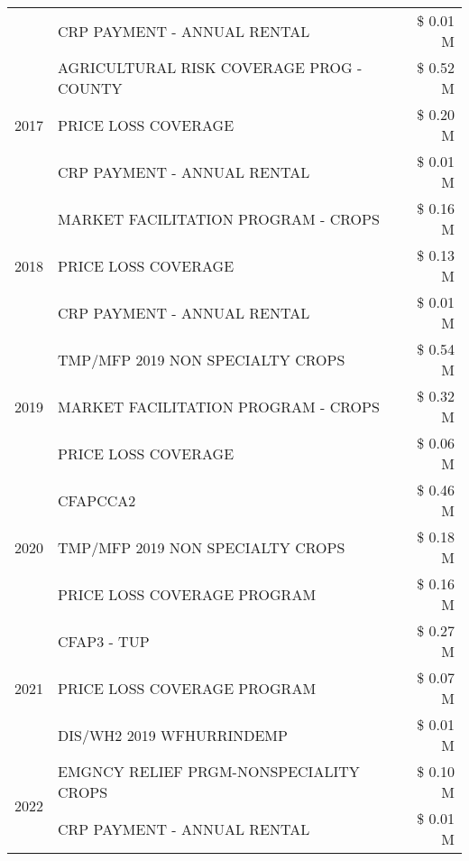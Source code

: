 \begin{tabular}{llr}
 & CRP PAYMENT - ANNUAL RENTAL & \$ 0.01 M \\
\cline{1-3}
\multirow[t]{3}{*}{2017} & AGRICULTURAL RISK COVERAGE PROG - COUNTY & \$ 0.52 M \\
 & PRICE LOSS COVERAGE & \$ 0.20 M \\
 & CRP PAYMENT - ANNUAL RENTAL & \$ 0.01 M \\
\cline{1-3}
\multirow[t]{3}{*}{2018} & MARKET FACILITATION PROGRAM - CROPS & \$ 0.16 M \\
 & PRICE LOSS COVERAGE & \$ 0.13 M \\
 & CRP PAYMENT - ANNUAL RENTAL & \$ 0.01 M \\
\cline{1-3}
\multirow[t]{3}{*}{2019} & TMP/MFP 2019 NON SPECIALTY CROPS & \$ 0.54 M \\
 & MARKET FACILITATION PROGRAM - CROPS & \$ 0.32 M \\
 & PRICE LOSS COVERAGE & \$ 0.06 M \\
\cline{1-3}
\multirow[t]{3}{*}{2020} & CFAPCCA2 & \$ 0.46 M \\
 & TMP/MFP 2019 NON SPECIALTY CROPS & \$ 0.18 M \\
 & PRICE LOSS COVERAGE PROGRAM & \$ 0.16 M \\
\cline{1-3}
\multirow[t]{3}{*}{2021} & CFAP3 - TUP & \$ 0.27 M \\
 & PRICE LOSS COVERAGE PROGRAM & \$ 0.07 M \\
 & DIS/WH2 2019 WFHURRINDEMP & \$ 0.01 M \\
\cline{1-3}
\multirow[t]{2}{*}{2022} & EMGNCY RELIEF PRGM-NONSPECIALITY CROPS & \$ 0.10 M \\
 & CRP PAYMENT - ANNUAL RENTAL & \$ 0.01 M \\
\cline{1-3}
\bottomrule
\end{tabular}
